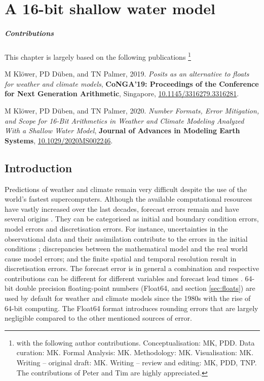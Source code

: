 \chapter{A 16-bit shallow water model}
\label{chap:shallow_water}

\small \paragraph{Contributions} This chapter is largely based on the following publications \footnote{with the following author contributions.
Conceptualisation: MK, PDD. Data curation: MK. Formal Analysis: MK. Methodology: MK. Visualisation: MK. Writing – original draft:
MK. Writing – review and editing: MK, PDD, TNP. The contributions of Peter and Tim are highly appreciated.}

\vspace{\baselineskip}
\indent M Klöwer, PD Düben, and TN Palmer, 2019. \emph{Posits as an alternative to floats for weather and climate models},
\textbf{CoNGA'19: Proceedings of the Conference for Next Generation Arithmetic}, Singapore,
\href{https://doi.org/10.1145/3316279.3316281}{10.1145/3316279.3316281}.

\indent M Klöwer, PD Düben, and TN Palmer, 2020. \emph{Number Formats, Error Mitigation, and Scope for 16-Bit Arithmetics
in Weather and Climate Modeling Analyzed With a Shallow Water Model}, \textbf{Journal of Advances in Modeling Earth Systems},
\href{https://doi.org/10.1029/2020MS002246}{10.1029/2020MS002246}.
\vspace{\baselineskip}
\normalsize

\section{Introduction}

Predictions of weather and climate remain very difficult despite the use of the world's fastest supercomputers. Although the available
computational resources have vastly increased over the last decades, forecast errors remain and have several origins
\citep{Palmer2012,Palmer2015}. They can be categorised as initial and boundary condition errors, model errors and discretisation
errors. For instance, uncertainties in the observational data and their assimilation contribute to the errors in the initial conditions
\citep{Ghil1991}; discrepancies between the mathematical model and the real world cause model errors; and the finite spatial and
temporal resolution result in discretisation errors. The forecast error is in general a combination and respective contributions can be
different for different variables and forecast lead times \citep{Jung2010,Palmer2019a}. 64-bit double precision floating-point numbers
(Float64, \cite{IEEE1985} and section \ref{sec:floats}) are used by default for weather and climate models since the 1980s with the
rise of 64-bit computing. The Float64 format introduces rounding errors \citep{Higham2002} that are largely negligible compared
to the other mentioned sources of error.

